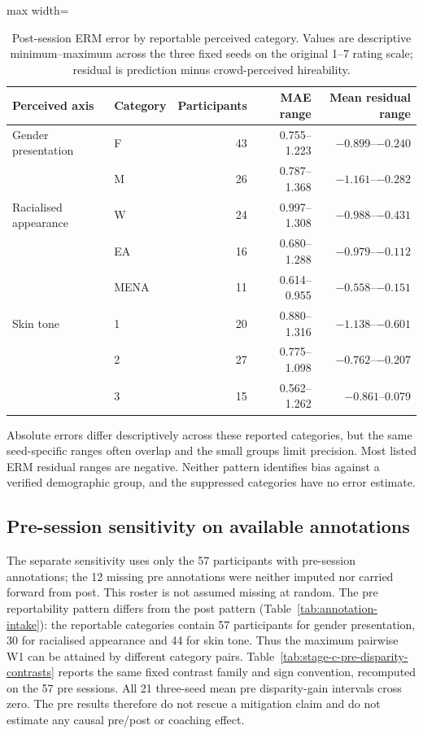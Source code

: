 \begin{table}[htbp]
\centering
\caption{Post-session ERM error by reportable perceived category. Values are descriptive
minimum--maximum across the three fixed seeds on the original 1--7 rating scale; residual is
prediction minus crowd-perceived hireability.}
\label{tab:stage-c-group-error}
\small
\begin{adjustbox}{max width=\textwidth}
\begin{tabular}{llrrr}
\toprule
Perceived axis & Category & Participants & MAE range & Mean residual range \\
\midrule
Gender presentation & F & 43 & 0.755--1.223 & $-0.899$--$-0.240$ \\
 & M & 26 & 0.787--1.368 & $-1.161$--$-0.282$ \\
Racialised appearance & W & 24 & 0.997--1.308 & $-0.988$--$-0.431$ \\
 & EA & 16 & 0.680--1.288 & $-0.979$--$-0.112$ \\
 & MENA & 11 & 0.614--0.955 & $-0.558$--$-0.151$ \\
Skin tone & 1 & 20 & 0.880--1.316 & $-1.138$--$-0.601$ \\
 & 2 & 27 & 0.775--1.098 & $-0.762$--$-0.207$ \\
 & 3 & 15 & 0.562--1.262 & $-0.861$--0.079 \\
\bottomrule
\end{tabular}
\end{adjustbox}
\end{table}
\FloatBarrier

Absolute errors differ descriptively across these reported categories, but the same
seed-specific ranges often overlap and the small groups limit precision. Most listed ERM
residual ranges are negative. Neither pattern identifies bias against a verified demographic
group, and the suppressed categories have no error estimate.

\subsection{Pre-session sensitivity on available annotations}

The separate sensitivity uses only the 57 participants with pre-session annotations; the 12
missing pre annotations were neither imputed nor carried forward from post. This roster is not
assumed missing at random. The pre reportability pattern differs from the post pattern
(Table~\ref{tab:annotation-intake}): the reportable categories contain 57 participants for gender
presentation, 30 for racialised appearance and 44 for skin tone. Thus the maximum pairwise W1
can be attained by different category pairs. Table~\ref{tab:stage-c-pre-disparity-contrasts}
reports the same fixed contrast
family and sign convention, recomputed on the 57 pre sessions. All 21 three-seed mean pre
disparity-gain intervals cross zero. The pre results therefore do not rescue a mitigation claim
and do not estimate any causal pre/post or coaching effect.

